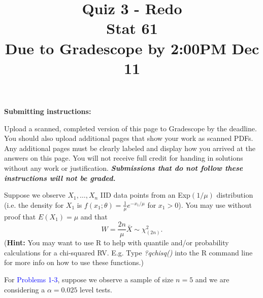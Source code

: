 \documentclass[12pt]{article}
\title{Quiz 3 - Redo\\
Stat 61\\ 
Due to Gradescope by 2:00PM Dec 11}
\date{}
\begin{document}
\maketitle

\vspace{-2.2cm}


\noindent \textbf{Submitting instructions:} 

\noindent Upload a scanned, completed version of this page to Gradescope by the deadline. You should also upload additional pages that show your work as scanned PDFs. Any additional pages must be clearly labeled and display how you arrived at the answers on this page. You will not receive full credit for handing in solutions without any work or justification. \textbf{\textit{Submissions that do not follow these instructions will not be graded.}} 

\vspace{0.5cm}

\noindent Suppose we observe $X_1, \dots, X_n$ IID data points from an Exp$(1/ \mu)$ distribution (i.e. the density for $X_1$ is $f(x_1;\theta) = \frac{1}{\mu}e^{-x_1/\mu}$ for $x_1 > 0$). You may use without proof that $E(X_1) = \mu$ and that 
$$W = \frac{2n}{\mu} \bar{X} \sim \chi_{(2n)}^{2}.$$ 
(\textbf{Hint:} You may want to use R to help with quantile and/or probability calculations for a chi-squared RV. E.g. Type \textit{?qchisq()} into the R command line for more info on how to use these functions.) 


\vspace{0.5cm}
\noindent For \textcolor{blue}{Problems 1-3}, suppose we observe a sample of size $n=5$ and we are considering a $\alpha=0.025$ level tests.
\end{document}
